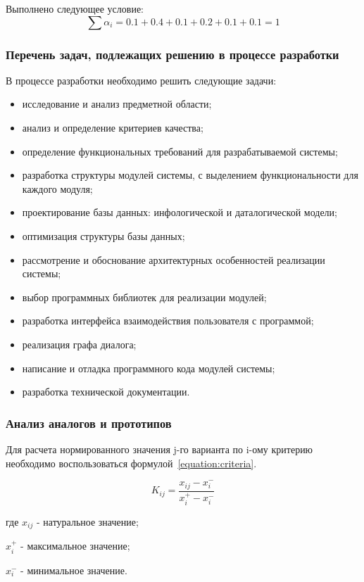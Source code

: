 Выполнено следующее условие:
\begin{equation}
\sum \alpha_i = 0.1 + 0.4 + 0.1 + 0.2 + 0.1 + 0.1 = 1
\end{equation}

\subsubsection{Перечень задач, подлежащих решению в процессе разработки}

В процессе разработки необходимо решить следующие задачи:
\begin{itemize}
\item исследование и анализ предметной области;
\item анализ и определение критериев качества;
\item определение функциональных требований для разрабатываемой системы;
\item разработка структуры модулей системы, с выделением функциональности для каждого модуля;
\item проектирование базы данных: инфологической и даталогической модели;
\item оптимизация структуры базы данных;
\item рассмотрение и обоснование архитектурных особенностей реализации системы;
\item выбор программных библиотек для реализации модулей;
\item разработка интерфейса взаимодействия пользователя с программой;
\item реализация графа диалога;
\item написание и отладка программного кода модулей системы;
\item разработка технической документации.
\end{itemize}

\subsubsection{Анализ аналогов и прототипов}

Для расчета нормированного значения j-го варианта по i-ому критерию необходимо
воспользоваться формулой~\ref{equation:criteria}.

\begin{equation}
\label{equation:criteria}
K_{ij} = \frac{x_{ij} - x_i^-}{x_i^+ - x_i^-}
\end{equation}
\begin{ESKDexplanation}
\item[где ] $x_{ij}$ - натуральное значение;
\item       $x_i^+$ - максимальное значение;
\item       $x_i^-$ - минимальное значение.
\end{ESKDexplanation}

